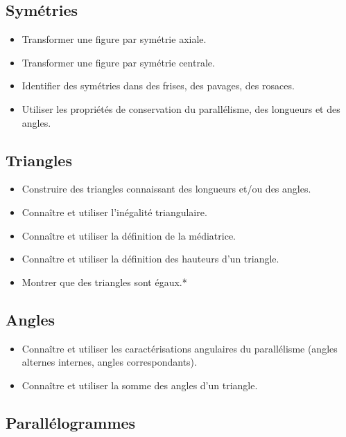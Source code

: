 \documentclass[a4paper,12pt,fleqn]{article}	
\begin{document}
\renewcommand{\labelitemi}{}

\subsection*{Symétries}

\begin{itemize}
	\item {}Transformer une figure par symétrie axiale.
	\item {}Transformer une figure par symétrie centrale.
	\item {}Identifier des symétries dans des frises, des pavages, des rosaces.
	\item {}Utiliser les propriétés de conservation du parallélisme, des longueurs et des angles.
\end{itemize}

\subsection*{Triangles}

\begin{itemize}
	\item {}Construire des triangles connaissant des longueurs et/ou des angles.
	\item {}Connaître et utiliser l'inégalité triangulaire.
	\item {}Connaître et utiliser la définition de la médiatrice.
	\item {}Connaître et utiliser la définition des hauteurs d’un triangle.
	\item {}Montrer que des triangles sont égaux.*
\end{itemize}

\subsection*{Angles}

\begin{itemize}
	\item {}Connaître et utiliser les caractérisations angulaires du parallélisme (angles alternes internes, angles correspondants).
	\item {}Connaître et utiliser la somme des angles d’un triangle.
\end{itemize}

\subsection*{Parallélogrammes}
\end{document}
